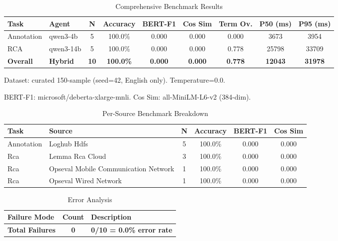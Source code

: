 
\begin{table}[h]
\centering
\caption{Comprehensive Benchmark Results}
\label{tab:comprehensive-results}
\begin{tabular}{llccccccc}
\toprule
\textbf{Task} & \textbf{Agent} & \textbf{N} & \textbf{Accuracy} & \textbf{BERT-F1} & \textbf{Cos Sim} & \textbf{Term Ov.} & \textbf{P50 (ms)} & \textbf{P95 (ms)} \\
\midrule
Annotation & qwen3-4b & 5 & 100.0\% & 0.000 & 0.000 & 0.000 & 3673 & 3954 \\
RCA & qwen3-14b & 5 & 100.0\% & 0.000 & 0.000 & 0.778 & 25798 & 33709 \\
\midrule
\textbf{Overall} & \textbf{Hybrid} & \textbf{10} & \textbf{100.0\%} & \textbf{0.000} & \textbf{0.000} & \textbf{0.778} & \textbf{12043} & \textbf{31978} \\
\bottomrule
\end{tabular}
\begin{tablenotes}
\small
\item Dataset: curated 150-sample (seed=42, English only). Temperature=0.0.
\item BERT-F1: microsoft/deberta-xlarge-mnli. Cos Sim: all-MiniLM-L6-v2 (384-dim).
\end{tablenotes}
\end{table}


\begin{table}[h]
\centering
\caption{Per-Source Benchmark Breakdown}
\label{tab:per-source}
\begin{tabular}{llcccc}
\toprule
\textbf{Task} & \textbf{Source} & \textbf{N} & \textbf{Accuracy} & \textbf{BERT-F1} & \textbf{Cos Sim} \\
\midrule
Annotation & Loghub Hdfs & 5 & 100.0\% & 0.000 & 0.000 \\
Rca & Lemma Rca Cloud & 3 & 100.0\% & 0.000 & 0.000 \\
Rca & Opseval Mobile Communication Network & 1 & 100.0\% & 0.000 & 0.000 \\
Rca & Opseval Wired Network & 1 & 100.0\% & 0.000 & 0.000 \\
\bottomrule
\end{tabular}
\end{table}


\begin{table}[h]
\centering
\caption{Error Analysis}
\label{tab:error-analysis}
\begin{tabular}{lcp{8cm}}
\toprule
\textbf{Failure Mode} & \textbf{Count} & \textbf{Description} \\
\midrule
\midrule
\textbf{Total Failures} & \textbf{0} & \textbf{0/10 = 0.0\% error rate} \\
\bottomrule
\end{tabular}
\end{table}


